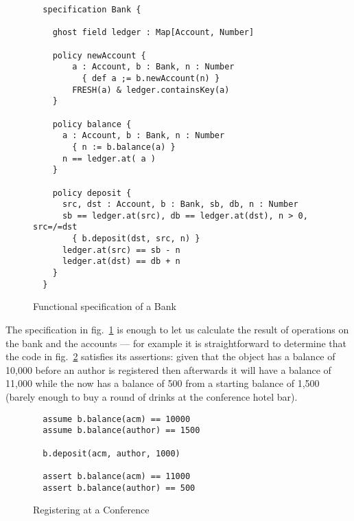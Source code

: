 \begin{figure}[tbp]
\begin{lstlisting}
  specification Bank {

    ghost field ledger : Map[Account, Number]

    policy newAccount {
        a : Account, b : Bank, n : Number
          { def a ;= b.newAccount(n) }
        FRESH(a) & ledger.containsKey(a)
    }

    policy balance {
      a : Account, b : Bank, n : Number
        { n := b.balance(a) }
      n == ledger.at( a )
    }

    policy deposit {
      src, dst : Account, b : Bank, sb, db, n : Number
      sb == ledger.at(src), db == ledger.at(dst), n > 0, src=/=dst
        { b.deposit(dst, src, n) }
      ledger.at(src) == sb - n
      ledger.at(dst) == db + n
    }
  }
\end{lstlisting}
\caption{Functional specification of a Bank}
\label{fig:BankSpec}
\end{figure}
{}


The specification in fig.~\ref{fig:BankSpec} is enough to let us
calculate the result of operations on the bank and the accounts ---
for example it is straightforward to determine that the code in
fig.~\ref{fig:rego} satisfies its assertions: given that the
 object has a balance of 10,000 before an author is
registered then afterwards it will have a balance of 11,000 while the
 now has a balance of 500 from a starting balance of 1,500
(barely enough to buy a round of drinks at the conference hotel bar).
{}
{}



\begin{figure}[tbp]
\begin{lstlisting}
  assume b.balance(acm) == 10000
  assume b.balance(author) == 1500

  b.deposit(acm, author, 1000)

  assert b.balance(acm) == 11000
  assert b.balance(author) == 500
\end{lstlisting}
\caption{Registering at a Conference}
\label{fig:rego}
\end{figure}

